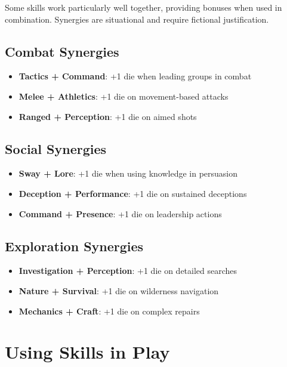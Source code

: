 Some skills work particularly well together, providing bonuses when used in combination. Synergies are situational and require fictional justification.

\subsection*{Combat Synergies}
\begin{itemize}
\item \textbf{Tactics + Command}: +1 die when leading groups in combat
\item \textbf{Melee + Athletics}: +1 die on movement-based attacks
\item \textbf{Ranged + Perception}: +1 die on aimed shots
\end{itemize}

\subsection*{Social Synergies}
\begin{itemize}
\item \textbf{Sway + Lore}: +1 die when using knowledge in persuasion
\item \textbf{Deception + Performance}: +1 die on sustained deceptions
\item \textbf{Command + Presence}: +1 die on leadership actions
\end{itemize}

\subsection*{Exploration Synergies}
\begin{itemize}
\item \textbf{Investigation + Perception}: +1 die on detailed searches
\item \textbf{Nature + Survival}: +1 die on wilderness navigation
\item \textbf{Mechanics + Craft}: +1 die on complex repairs
\end{itemize}

\section{Using Skills in Play}

